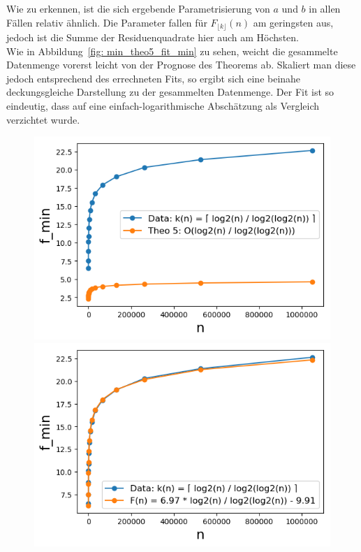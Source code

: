 \noindent
Wie zu erkennen, ist die sich ergebende Parametrisierung von $a$ und $b$ in allen Fällen relativ ähnlich. Die Parameter fallen für $F_{\lfloor k \rfloor}(n)$ am geringsten aus, jedoch ist die Summe der Residuenquadrate hier auch am Höchsten.\\[.1cm]
Wie in Abbildung~\ref{fig: min_theo5_fit_min} zu sehen, weicht die gesammelte Datenmenge vorerst leicht von der Prognose des Theorems ab. Skaliert man diese jedoch entsprechend des errechneten Fits, so ergibt sich eine beinahe deckungsgleiche Darstellung zu der gesammelten Datenmenge. Der Fit ist so eindeutig, dass auf eine einfach-logarithmische Abschätzung als Vergleich verzichtet wurde.

\begin{figure}[H]
	\hspace*{-.4cm}
    \begin{minipage}[t]{.30\textwidth}
        \centering
        \includegraphics[width=1.1\textwidth]{pictures/min_theo5_min_ceil_pred.png}
        \vspace*{-0.06cm}
    \end{minipage}
    \hspace*{.4cm}
    \begin{minipage}[t]{.30\textwidth}
        \centering
        \includegraphics[width=1.11\textwidth]{pictures/min_theo5_min_ceil_fit.png}

\end{minipage}
\end{figure}
